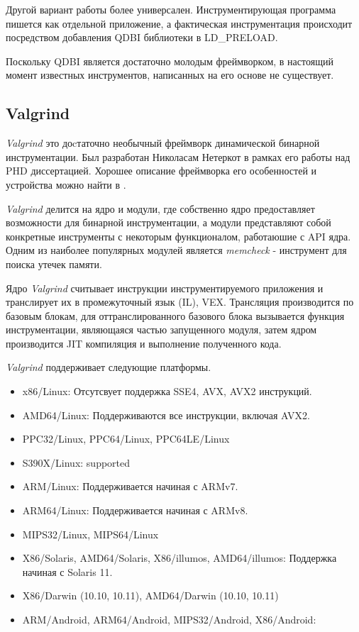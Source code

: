 Другой вариант работы более универсален. Инструментирующая программа пишется как отдельной приложение, а фактическая инструментация происходит посредством добавления QDBI библиотеки в LD\_PRELOAD.

Поскольку QDBI является достаточно молодым фреймворком, в настоящий момент известных инструментов, написанных на его основе не существует.


\subsection{Valgrind}

\emph{Valgrind} это доcтаточно необычный фреймворк динамической бинарной инструментации. Был разработан Николасам Нетеркот в рамках его работы над PHD диссертацией. Хорошее описание фреймворка его особенностей и устройства можно найти в \cite{VALGRIND}.


\emph{Valgrind} делится на ядро и модули, где собственно ядро предоставляет возможности для бинарной инструментации, а модули представляют собой конкретные инструменты с некоторым функционалом, работаюшие с API ядра. Одним из наиболее популярных модулей является \emph{memcheck} - инструмент для поиска утечек памяти.

Ядро \emph{Valgrind} считывает инструкции инструментируемого приложения и транслирует их в промежуточный язык (IL), VEX. Трансляция производится по базовым блокам, для оттранслированного базового блока вызывается функция инструментации, являющаяся частью запущенного модуля, затем ядром производится JIT компиляция и выполнение полученного кода.

\emph{Valgrind} поддерживает следующие платформы.

\begin{itemize}

    \item x86/Linux: Отсутсвует поддержка SSE4, AVX, AVX2 инструкций.
    \item AMD64/Linux: Поддерживаются все инструкции, включая AVX2.
    \item PPC32/Linux, PPC64/Linux, PPC64LE/Linux
    \item S390X/Linux: supported
    \item ARM/Linux: Поддерживается начиная с ARMv7.
    \item ARM64/Linux: Поддерживается начиная с ARMv8.
    \item MIPS32/Linux, MIPS64/Linux
    \item X86/Solaris, AMD64/Solaris, X86/illumos, AMD64/illumos: Поддержка начиная с Solaris 11.
    \item X86/Darwin (10.10, 10.11), AMD64/Darwin (10.10, 10.11)
    \item ARM/Android, ARM64/Android, MIPS32/Android, X86/Android:
\end{itemize}

